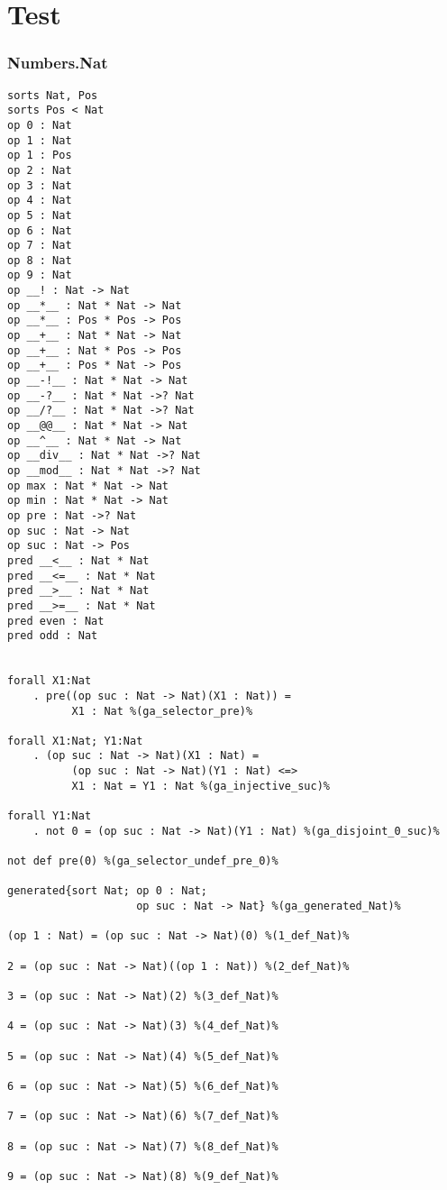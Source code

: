 \documentclass[11pt,a4paper]{article}
\begin{document}
\part*{Test}
\section*{Numbers.Nat}
\begin{verbatim}
sorts Nat, Pos
sorts Pos < Nat
op 0 : Nat
op 1 : Nat
op 1 : Pos
op 2 : Nat
op 3 : Nat
op 4 : Nat
op 5 : Nat
op 6 : Nat
op 7 : Nat
op 8 : Nat
op 9 : Nat
op __! : Nat -> Nat
op __*__ : Nat * Nat -> Nat
op __*__ : Pos * Pos -> Pos
op __+__ : Nat * Nat -> Nat
op __+__ : Nat * Pos -> Pos
op __+__ : Pos * Nat -> Pos
op __-!__ : Nat * Nat -> Nat
op __-?__ : Nat * Nat ->? Nat
op __/?__ : Nat * Nat ->? Nat
op __@@__ : Nat * Nat -> Nat
op __^__ : Nat * Nat -> Nat
op __div__ : Nat * Nat ->? Nat
op __mod__ : Nat * Nat ->? Nat
op max : Nat * Nat -> Nat
op min : Nat * Nat -> Nat
op pre : Nat ->? Nat
op suc : Nat -> Nat
op suc : Nat -> Pos
pred __<__ : Nat * Nat
pred __<=__ : Nat * Nat
pred __>__ : Nat * Nat
pred __>=__ : Nat * Nat
pred even : Nat
pred odd : Nat


forall X1:Nat
    . pre((op suc : Nat -> Nat)(X1 : Nat)) =
          X1 : Nat %(ga_selector_pre)%

forall X1:Nat; Y1:Nat
    . (op suc : Nat -> Nat)(X1 : Nat) =
          (op suc : Nat -> Nat)(Y1 : Nat) <=>
          X1 : Nat = Y1 : Nat %(ga_injective_suc)%

forall Y1:Nat
    . not 0 = (op suc : Nat -> Nat)(Y1 : Nat) %(ga_disjoint_0_suc)%

not def pre(0) %(ga_selector_undef_pre_0)%

generated{sort Nat; op 0 : Nat;
                    op suc : Nat -> Nat} %(ga_generated_Nat)%

(op 1 : Nat) = (op suc : Nat -> Nat)(0) %(1_def_Nat)%

2 = (op suc : Nat -> Nat)((op 1 : Nat)) %(2_def_Nat)%

3 = (op suc : Nat -> Nat)(2) %(3_def_Nat)%

4 = (op suc : Nat -> Nat)(3) %(4_def_Nat)%

5 = (op suc : Nat -> Nat)(4) %(5_def_Nat)%

6 = (op suc : Nat -> Nat)(5) %(6_def_Nat)%

7 = (op suc : Nat -> Nat)(6) %(7_def_Nat)%

8 = (op suc : Nat -> Nat)(7) %(8_def_Nat)%

9 = (op suc : Nat -> Nat)(8) %(9_def_Nat)%


\end{verbatim}
\end{document}
